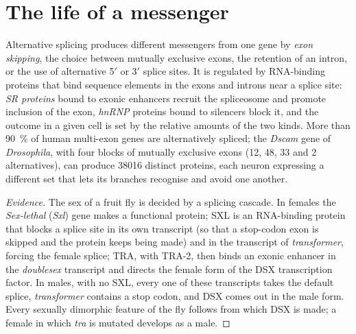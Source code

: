 \section{The life of a messenger}

\begin{definition}\label{def:b3:rna-regulation:splicing}
Alternative splicing produces different messengers from one gene by
\emph{exon skipping}, the choice between mutually exclusive exons, the
retention of an intron, or the use of alternative 5$'$ or 3$'$ splice
sites. It is regulated by RNA-binding proteins that bind sequence
elements in the exons and introns near a splice site: \emph{SR
proteins} bound to exonic enhancers recruit the spliceosome and promote
inclusion of the exon, \emph{hnRNP} proteins bound to silencers block
it, and the outcome in a given cell is set by the relative amounts of
the two kinds. More than \qty{90}{\%} of human multi-exon genes are
alternatively spliced; the \emph{Dscam} gene of \emph{Drosophila}, with
four blocks of mutually exclusive exons (12, 48, 33 and 2
alternatives), can produce \num{38016} distinct proteins, each neuron
expressing a different set that lets its branches recognise and avoid
one another.
\end{definition}

\begin{proof}[Evidence]
The sex of a fruit fly is decided by a splicing cascade. In females the
\emph{Sex-lethal} (\emph{Sxl}) gene makes a functional protein; SXL is an
RNA-binding protein that blocks a splice site in its own transcript
(so that a stop-codon exon is skipped and the protein keeps being made)
and in the transcript of \emph{transformer}, forcing the female
splice; TRA, with TRA-2, then binds an exonic enhancer in the
\emph{doublesex} transcript and directs the female form of the DSX
transcription factor. In males, with no SXL, every one of these
transcripts takes the default splice, \emph{transformer} contains a
stop codon, and DSX comes out in the male form. Every sexually
dimorphic feature of the fly follows from which DSX is made; a female
in which \emph{tra} is mutated develops as a male.
\end{proof}

